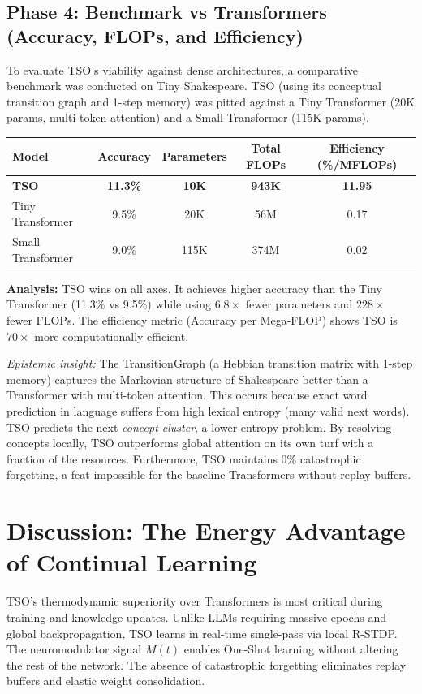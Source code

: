 \documentclass{article}
\begin{document}
\subsection{Phase 4: Benchmark vs Transformers (Accuracy, FLOPs, and Efficiency)}

To evaluate TSO's viability against dense architectures, a comparative benchmark was conducted on Tiny Shakespeare. TSO (using its conceptual transition graph and 1-step memory) was pitted against a Tiny Transformer (20K params, multi-token attention) and a Small Transformer (115K params).

\begin{center}
\begin{tabular}{lcccc}
\toprule
Model & Accuracy & Parameters & Total FLOPs & Efficiency (\%/MFLOPs) \\
\midrule
\textbf{TSO} & \textbf{11.3\%} & \textbf{10K} & \textbf{943K} & \textbf{11.95} \\
Tiny Transformer & 9.5\% & 20K & 56M & 0.17 \\
Small Transformer & 9.0\% & 115K & 374M & 0.02 \\
\bottomrule
\end{tabular}
\end{center}

\textbf{Analysis:} TSO wins on all axes. It achieves higher accuracy than the Tiny Transformer (11.3\% vs 9.5\%) while using $6.8\times$ fewer parameters and $228\times$ fewer FLOPs. The efficiency metric (Accuracy per Mega-FLOP) shows TSO is $70\times$ more computationally efficient.

\textit{Epistemic insight:} The TransitionGraph (a Hebbian transition matrix with 1-step memory) captures the Markovian structure of Shakespeare better than a Transformer with multi-token attention. This occurs because exact word prediction in language suffers from high lexical entropy (many valid next words). TSO predicts the next \textit{concept cluster}, a lower-entropy problem. By resolving concepts locally, TSO outperforms global attention on its own turf with a fraction of the resources. Furthermore, TSO maintains 0\% catastrophic forgetting, a feat impossible for the baseline Transformers without replay buffers.

\section{Discussion: The Energy Advantage of Continual Learning}

TSO's thermodynamic superiority over Transformers is most critical during training and knowledge updates. Unlike LLMs requiring massive epochs and global backpropagation, TSO learns in real-time single-pass via local R-STDP. The neuromodulator signal $M(t)$ enables One-Shot learning without altering the rest of the network. The absence of catastrophic forgetting eliminates replay buffers and elastic weight consolidation.
\end{document}
